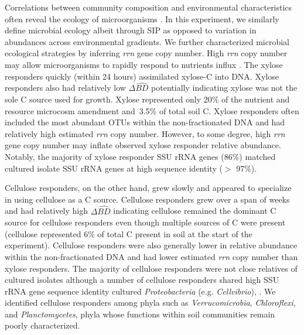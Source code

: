 Correlations between community composition and environmental characteristics
often reveal the ecology of microorganisms \citep{Fierer2007}. In this
experiment, we similarly define microbial ecology albeit through SIP as opposed
to variation in abundances across environmental gradients. We
further characterized microbial ecological strategies by inferring \textit{rrn}
gene copy number. High \textit{rrn} copy number may allow microorganisms to
rapidly respond to nutrients influx \citep{Klappenbach_2000}. The xylose
responders quickly (within 24 hours) assimilated xylose-C into DNA. Xylose
responders also had relatively low $\Delta\hat{BD}$ potentially indicating
xylose was not the sole C source used for growth. Xylose represented only 20\%
of the nutrient and resource microcosm amendment and~3.5\% of total soil C.
Xylose responders often included the most abundant OTUs within the
non-fractionated DNA and had relatively high estimated \textit{rrn} copy
number. However, to some degree, high \textit{rrn} gene copy number may inflate
observed xylose responder relative abundance. Notably, the majority of xylose
responder SSU rRNA genes (86\%) matched cultured isolate SSU rRNA genes at high
sequence identity ($>$ 97\%). 

Cellulose responders, on the other hand, grew slowly and appeared to specialize
in using cellulose as a C source. Cellulose responders grew over a span of weeks
and had relatively high $\Delta\hat{BD}$ indicating cellulose remained the
dominant C source for cellulose responders even though multiple sources of
C were present (cellulose represented 6\% of total C present in soil at the
start of the experiment). Cellulose responders were also generally lower in
relative abundance within the non-fractionated DNA and had lower estimated
\textit{rrn} copy number than xylose responders. The majority of cellulose
responders were not close relatives of cultured isolates although a number of
cellulose responders shared high SSU rRNA gene sequence identity cultured
\textit{Proteobacteria} (e.g. \textit{Cellvibrio}), . We identified cellulose
responders among phyla such as \textit{Verrucomicrobia}, \textit{Chloroflexi},
and \textit{Planctomycetes}, phyla whose functions within soil communities
remain poorly characterized.

